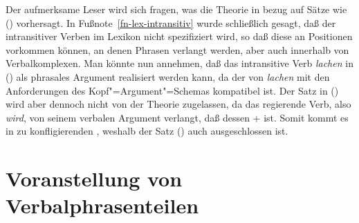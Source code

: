 \noindent
Der aufmerksame Leser wird sich fragen, was die Theorie in bezug auf Sätze wie () vorhersagt.%
\z
In Fußnote~\ref{fn-lex-intransitiv} wurde schließlich gesagt, daß der \lexw intransitiver Verben
im Lexikon nicht spezifiziert wird, so daß diese an Positionen vorkommen können, an denen Phrasen
verlangt werden, aber auch innerhalb von Verbalkomplexen. Man könnte nun annehmen, daß das intransitive Verb
\emph{lachen} in () als phrasales Argument realisiert werden kann, da der \lexw von \emph{lachen}
mit den Anforderungen des Kopf"=Argument"=Schemas kompatibel ist. Der Satz in () wird aber dennoch
nicht von der Theorie zugelassen, da das regierende Verb, also \emph{wird}, von seinem verbalen Argument verlangt,
daß dessen \lexw + ist. Somit kommt es in \kasen zu konfligierenden \lexwen, 
weshalb der Satz () auch ausgeschlossen ist.


\section{Voranstellung von Verbalphrasenteilen}
\label{sec-pvp}

